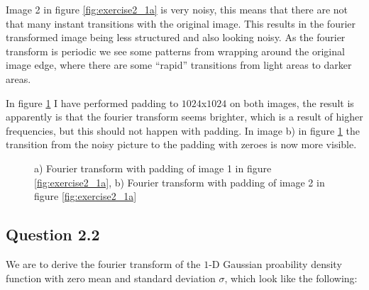 \documentclass[a4paper, 10pt, final]{article}
\begin{document}
Image 2 in figure \ref{fig:exercise2_1a} is very noisy, this means
that there are not that many instant transitions with the original
image. This results in the fourier transformed image being less
structured and also looking noisy. As the fourier transform is
periodic we see some patterns from wrapping around the original image
edge, where there are some ``rapid'' transitions from light areas to
darker areas.

In figure \ref{fig:exercise2_1b} I have performed padding to
$1024$x$1024$ on both images, the result is apparently is that the
fourier transform seems brighter, which is a result of higher
frequencies, but this should not happen with padding. In image b) in
figure \ref{fig:exercise2_1b} the transition from the noisy picture to
the padding with zeroes is now more visible.

\begin{figure}[!ht]
\centering
{}
\caption{a) Fourier transform with padding of image 1 in figure \ref{fig:exercise2_1a}, b) Fourier transform with padding of image 2 in figure \ref{fig:exercise2_1a} }
\label{fig:exercise2_1b}
\end{figure}

\subsection*{Question 2.2}
We are to derive the fourier transform of the $1$-D Gaussian proability density function with zero mean and standard deviation $\sigma$, which look like the following:
\end{document}
